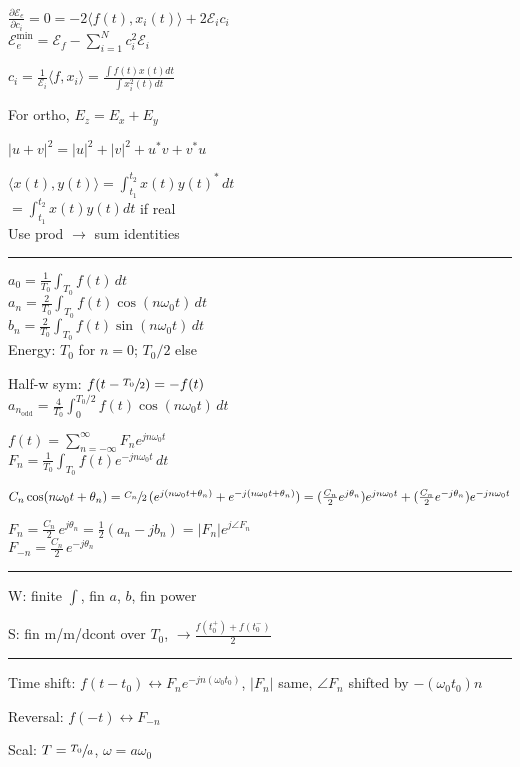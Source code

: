 \documentclass[4pt]{article}
\theoremstyle{definition}
\theoremstyle{definition}
\renewcommand{\o}{\omega}
\newcommand{\ra}{\rightarrow}
\newcommand{\lra}{\leftrightarrow}
\begin{document}
    $\frac{\partial \mathcal{E}_e}{\partial c_i} = 0 = -2 \langle f(t), x_i(t)\rangle + 2\mathcal{E}_i c_i$\\
    $\mathcal{E}_e^{\text{min}} = \mathcal{E}_f - \sum_{i=1}^N c_i^2 \mathcal{E}_i$

    \(c_i = \frac{1}{\mathcal{E}_i}\langle f, x_i\rangle = \frac{\int f(t) x(t) dt}{\int x_i^2(t) dt}\)    

    For ortho, $E_z = E_x + E_y$
        

    $|u+v|^2 = |u|^2 + |v|^2 + u^*v + v^*u$

    $\langle x(t), y(t)\rangle = \int_{t_1}^{t_2} x(t) y(t)^* \, dt$\\
    \( = \int_{t_1}^{t_2} x(t) y(t) dt\) if real\\
    Use prod $\ra$ sum identities
\rule{\linewidth}{0.5pt}
    $a_0 = \frac{1}{T_0} \int_{T_0} f(t)\, dt$\\
    $a_n = \frac{2}{T_0} \int_{T_0} f(t) \cos(n\o_0t)\,dt$\\
    $b_n = \frac{2}{T_0} \int_{T_0} f(t) \sin(n\o_0t)\,dt$\\
    Energy: $T_0$ for $n=0$; $T_0/2$ else
     
    Half-w sym: $f(t - \sfrac{T_0}{2}) = -f(t)$\\
    $a_{n_\mathrm{odd}} = \frac{4}{T_0}\int_{0}^{T_0/2} f(t) \cos (n\o_0 t) \, dt$

    $f(t) = \sum_{n=-\infty}^{\infty} F_n e^{jn\o_0 t}$\\
    $F_n = \frac{1}{T_0}\int_{T_0} f(t) e^{-jn\o_0t}\,dt$

    $C_n\cos(n\o_0 t + \theta_n) = \sfrac{C_n}{2} \, (e^{j(n\o_0t + \theta_n)} + e^{-j(n\o_0 t + \theta_n)}) = (\frac{C_n} 2 e^{j\theta_n}) e^{jn\o_0 t} + (\frac{C_n} 2 e^{-j\theta_n}) e^{-jn\o_0 t}$

    $F_n = \frac{C_n}{2}\, e^{j\theta_n} = \frac 1 2 (a_n - jb_n) = |F_n| e^{j\angle F_n}$\\
    $F_{-n} = \frac{C_n}{2}\, e^{-j\theta_n}$
\rule{\linewidth}{0.5pt}
    W: finite $\int$, fin $a$, $b$, fin power

    S: fin m/m/dcont over $T_0$, $\ra \frac{f(t_0^+) + f(t_0^-)}{2}$
\rule{\linewidth}{0.5pt}
    Time shift: $f(t-t_0)\lra F_n e^{-jn(\o_0 t_0)}$, $|F_n|$ same, $\angle F_n$ shifted by $-(\o_0 t_0)n$

    Reversal: $f(-t)\lra F_{-n}$

    Scal: $T = \sfrac {T_0} a$, $\o = a\o_0$
\end{document}
